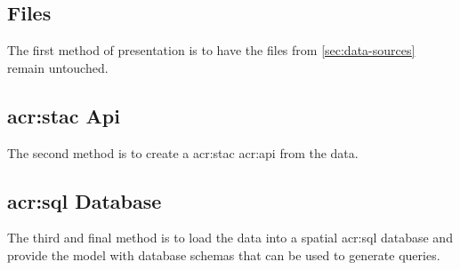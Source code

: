\subsection{Files}
\label{subsec:files}

The first method of presentation is to have the files from \autoref{sec:data-sources} remain untouched.

\subsection[STAC]{\acrshort{acr:stac} Api}
\label{subsec:stac-data}

The second method is to create a \acrshort{acr:stac} \acrshort{acr:api} from the data.

\subsection[SQL Database]{\acrshort{acr:sql} Database}
\label{subsec:sql-db}

The third and final method is to load the data into a spatial \acrshort{acr:sql} database and provide the model with database schemas that can be used to generate queries.

\glsresetall
